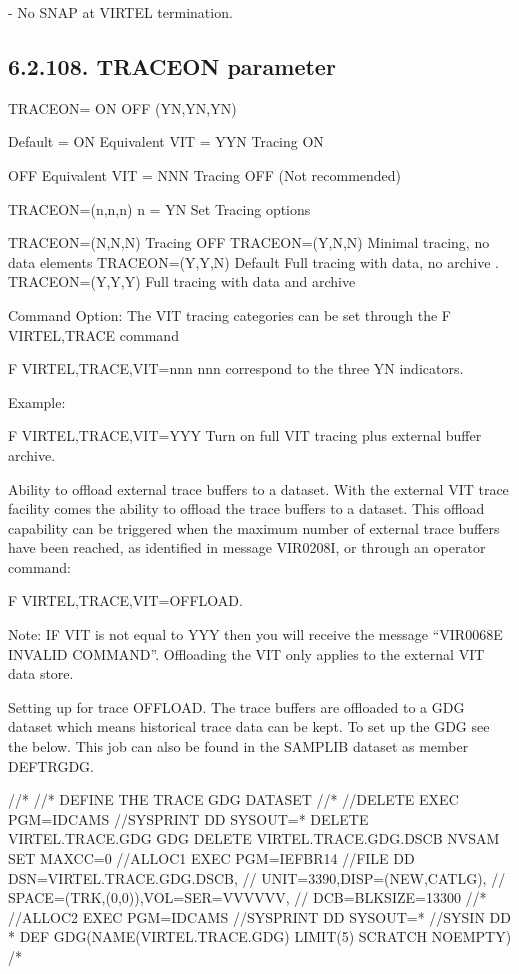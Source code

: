 \documentclass[letterpaper,10pt,english]{sphinxmanual}
\begin{document}
 - No SNAP at VIRTEL termination.


\subsection{6.2.108. TRACEON parameter}
\label{\detokenize{Installation_Guide:traceon-parameter}}
\begin{sphinxVerbatim}[commandchars=\\\{\}]
TRACEON= ON \textbar{} OFF \textbar{} (Y\textbar{}N,Y\textbar{}N,Y\textbar{}N)

Default = ON    Equivalent VIT = YYN    Tracing ON

OFF             Equivalent VIT = NNN    Tracing OFF (Not recommended)

TRACEON=(n,n,n)         n = Y\textbar{}N         Set Tracing options

TRACEON=(N,N,N)                 Tracing OFF
TRACEON=(Y,N,N)                 Minimal tracing, no data elements
TRACEON=(Y,Y,N) Default         Full tracing with data, no archive      .
TRACEON=(Y,Y,Y)                 Full tracing with data and archive

Command Option:
The VIT tracing categories can be set through the F VIRTEL,TRACE command

F VIRTEL,TRACE,VIT=nnn                  nnn correspond to the three Y\textbar{}N indicators.

Example:

F VIRTEL,TRACE,VIT=YYY                  Turn on full VIT tracing plus external buffer archive.

Ability to offload external trace buffers to a dataset.
With the external VIT trace facility comes the ability to offload the trace buffers to a dataset. This offload capability can be triggered when the maximum number of external trace buffers have been reached, as identified in message VIR0208I, or through an operator command:

F VIRTEL,TRACE,VIT=OFFLOAD.

Note: IF VIT is not equal to YYY then you will receive the message “VIR0068E INVALID COMMAND”. Offloading the VIT only applies to the external VIT data store.

Setting up for trace \PYGZdq{}OFFLOAD\PYGZdq{}.
The trace buffers are offloaded to a GDG dataset which means historical trace data can be kept. To set up the GDG see the below. This job can also be found in the SAMPLIB dataset as member DEFTRGDG.

//*
//* DEFINE THE TRACE GDG DATASET
//*
//DELETE   EXEC PGM=IDCAMS
//SYSPRINT DD SYSOUT=*
 DELETE VIRTEL.TRACE.GDG GDG
 DELETE VIRTEL.TRACE.GDG.DSCB NVSAM
 SET MAXCC=0
//ALLOC1   EXEC PGM=IEFBR14
//FILE     DD DSN=VIRTEL.TRACE.GDG.DSCB,
//            UNIT=3390,DISP=(NEW,CATLG),
//            SPACE=(TRK,(0,0)),VOL=SER=VVVVVV,
//            DCB=BLKSIZE=13300
//*
//ALLOC2   EXEC PGM=IDCAMS
//SYSPRINT  DD SYSOUT=*
//SYSIN     DD *
 DEF GDG(NAME(VIRTEL.TRACE.GDG) LIMIT(5) SCRATCH NOEMPTY)
/*
\end{sphinxVerbatim}
\end{document}
